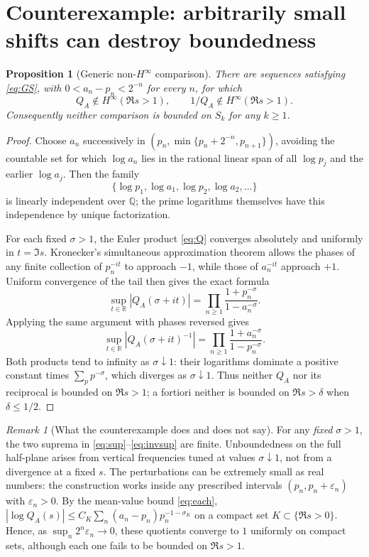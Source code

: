 \documentclass[12pt,letterpaper]{article}
\newtheorem{proposition}[theorem]{Proposition}
\theoremstyle{remark}
\newtheorem{remark}[theorem]{Remark}
\numberwithin{equation}{section}
\begin{document}
\section{Counterexample: arbitrarily small shifts can destroy boundedness}\label{sec:counter}
\begin{proposition}[Generic non-$H^\infty$ comparison]\label{prop:counter}
There are sequences satisfying \eqref{eq:GS}, with $0<a_n-p_n<2^{-n}$ for every $n$, for which
\[
 Q_A\notin H^\infty(\Re s>1),\qquad
 1/Q_A\notin H^\infty(\Re s>1).
\]
Consequently neither comparison is bounded on $S_k$ for any $k\ge1$.
\end{proposition}
\begin{proof}
Choose $a_n$ successively in
$(p_n,\min\{p_n+2^{-n},p_{n+1}\})$, avoiding the countable set for which $\log a_n$ lies in the rational linear span of all $\log p_j$ and the earlier $\log a_j$. Then the family
\[\{\log p_1,\log a_1,\log p_2,\log a_2,\ldots\}\]
is linearly independent over $\mathbb Q$; the prime logarithms themselves have this independence by unique factorization.

For each fixed $\sigma>1$, the Euler product \eqref{eq:Q} converges absolutely and uniformly in $t=\Im s$. Kronecker's simultaneous approximation theorem allows the phases of any finite collection of $p_n^{-it}$ to approach $-1$, while those of $a_n^{-it}$ approach $+1$. Uniform convergence of the tail then gives the exact formula
\begin{equation}\label{eq:sup}
 \sup_{t\in\mathbb R}|Q_A(\sigma+it)|
 =\prod_{n\ge1}\frac{1+p_n^{-\sigma}}{1-a_n^{-\sigma}}.
\end{equation}
Applying the same argument with phases reversed gives
\begin{equation}\label{eq:invsup}
 \sup_{t\in\mathbb R}|Q_A(\sigma+it)^{-1}|
 =\prod_{n\ge1}\frac{1+a_n^{-\sigma}}{1-p_n^{-\sigma}}.
\end{equation}
Both products tend to infinity as $\sigma\downarrow1$: their logarithms dominate a positive constant times $\sum_p p^{-\sigma}$, which diverges as $\sigma\downarrow1$. Thus neither $Q_A$ nor its reciprocal is bounded on $\Re s>1$; a fortiori neither is bounded on $\Re s>\delta$ when $\delta\le1/2$.
\end{proof}

\begin{remark}[What the counterexample does and does not say]
For any \emph{fixed} $\sigma>1$, the two suprema in \eqref{eq:sup}--\eqref{eq:invsup} are finite. Unboundedness on the full half-plane arises from vertical frequencies tuned at values $\sigma\downarrow1$, not from a divergence at a fixed $s$. The perturbations can be extremely small as real numbers: the construction works inside any prescribed intervals $(p_n,p_n+\varepsilon_n)$ with $\varepsilon_n>0$. By the mean-value bound \eqref{eq:each}, $|\log Q_A(s)|\le C_K\sum_n(a_n-p_n)p_n^{-1-\sigma_K}$ on a compact set $K\subset\{\Re s>0\}$. Hence, as $\sup_n 2^n\varepsilon_n\to0$, these quotients converge to $1$ uniformly on compact sets, although each one fails to be bounded on $\Re s>1$.
\end{remark}
\end{document}
